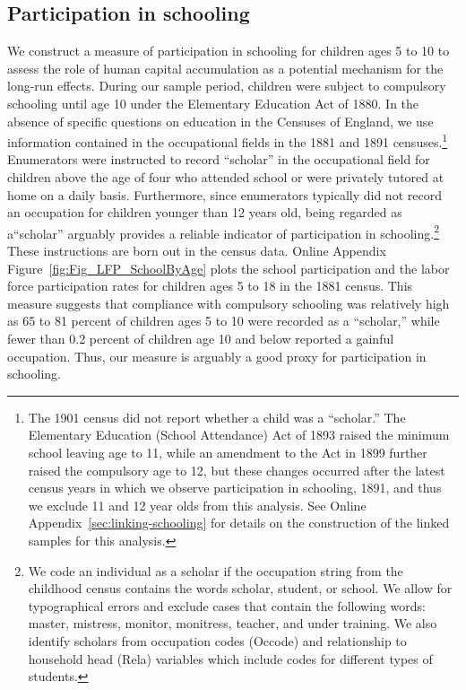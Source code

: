 \documentclass[12pt,english]{article}
\begin{document}
\subsection{Participation in schooling\label{subsec:schooling-spec}}

We construct a measure of participation in schooling for children ages 5 to 10 to assess the role of human capital accumulation as a potential mechanism for the long-run effects. During our sample period, children were subject to compulsory schooling until age 10 under the Elementary Education Act of 1880. In the absence of specific questions on education in the Censuses of England, we use information contained in the occupational fields in the 1881 and 1891 censuses.\footnote{The 1901 census did not report whether a child was a ``scholar.'' The Elementary Education (School Attendance) Act of 1893 raised the minimum school leaving age to 11, while an amendment to the Act in 1899 further raised the compulsory age to 12, but these changes occurred after the latest census years in which we observe participation in schooling, 1891, and thus we exclude 11 and 12 year olds from this analysis. See Online Appendix~\ref{sec:linking-schooling} for details on the construction of the linked samples for this analysis.} Enumerators were instructed to record ``scholar'' in the occupational field for children above the age of four who attended school or were privately tutored at home on a daily basis. Furthermore, since enumerators typically did not record an occupation for children younger than 12 years old, being regarded as a``scholar'' arguably provides a reliable indicator of participation in schooling.\footnote{We code an individual as a scholar if the occupation string from the childhood census contains the words scholar, student, or school. We allow for typographical errors and exclude cases that contain the following words: master, mistress, monitor, monitress, teacher, and under training. We also identify scholars from occupation codes (Occode) and relationship to household head (Rela) variables which include codes for different types of students.} These instructions are born out in the census data. Online Appendix Figure~\ref{fig:Fig_LFP_SchoolByAge} plots the school participation and the labor force participation rates for children ages 5 to 18 in the 1881 census. This measure suggests that compliance with compulsory schooling was relatively high as 65 to 81 percent of children ages 5 to 10 were recorded as a ``scholar,'' while fewer than 0.2 percent of children age 10 and below reported a gainful occupation. Thus, our measure is arguably a good proxy for participation in schooling. 
\end{document}
